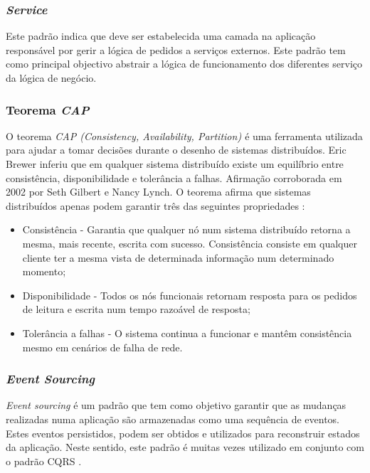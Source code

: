 \subsubsection{\emph{Service} \label{service_pattern}}
Este padrão indica que deve ser estabelecida uma camada na aplicação responsável por gerir a lógica de pedidos a serviços externos. Este padrão tem como principal objectivo abstrair a lógica de funcionamento dos diferentes serviço da lógica de negócio\cite{service_design_patterns}.

\subsubsection{Teorema \emph{CAP}} \label{cap_theorem}
O teorema \emph{CAP (Consistency, Availability, Partition) \label{sym:cap}} é uma ferramenta utilizada para ajudar a tomar decisões durante o desenho de sistemas distribuídos. Eric Brewer inferiu que em qualquer sistema distribuído existe um equilíbrio entre consistência, disponibilidade e tolerância a falhas. Afirmação corroborada em 2002 por Seth Gilbert e Nancy Lynch. O teorema afirma que sistemas distribuídos apenas podem garantir três das seguintes propriedades \cite{cap_theorem}:

\begin{itemize}
    \item Consistência - Garantia que qualquer nó num sistema distribuído retorna a mesma, mais recente, escrita com sucesso. Consistência consiste em qualquer cliente ter a mesma vista de determinada informação num determinado momento;
    \item Disponibilidade - Todos os nós funcionais retornam resposta para os pedidos de leitura e escrita num tempo razoável de resposta;
    \item Tolerância a falhas - O sistema continua a funcionar e mantêm consistência mesmo em cenários de falha de rede.
\end{itemize}

\subsubsection{\emph{Event Sourcing} \label{event_sourcing}}
\emph{Event sourcing} é um padrão que tem como objetivo garantir que as mudanças realizadas numa aplicação são armazenadas como uma sequência de eventos. Estes eventos persistidos, podem ser obtidos e utilizados para reconstruir estados da aplicação.
Neste sentido, este padrão é muitas vezes utilizado em conjunto com o padrão CQRS \cite{event_sourcing}.

